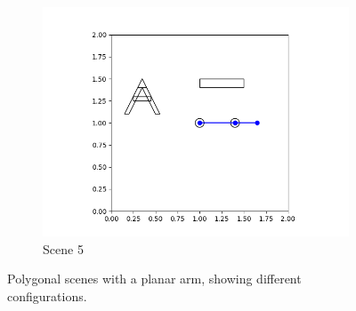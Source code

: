 \documentclass{article}
\begin{document}
\begin{figure}[h!]
\begin{subfigure}{0.45\textwidth}
        \includegraphics[width=\textwidth]{polygon_scene5.png}
        \caption{Scene 5}
    \end{subfigure}
    \caption{Polygonal scenes with a planar arm, showing different configurations.}
    \label{fig:scenes}
\end{figure}
\end{document}
